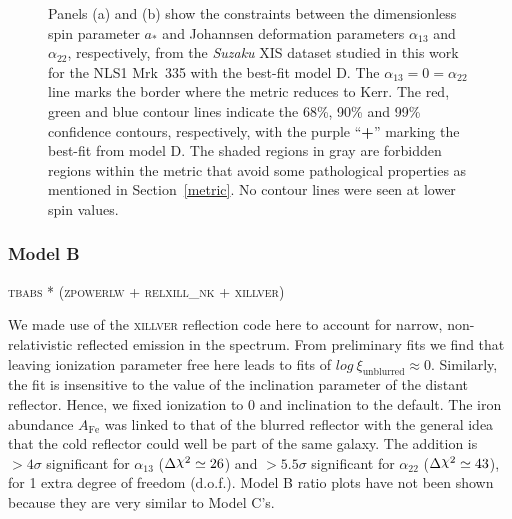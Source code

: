 \documentclass[aps,prd,twocolumn,superscriptaddress,nofootinbib,amsmath,amssymb]{revtex4-1}
\DeclareRobustCommand{\rchi}{{\mathpalette\irchi\relax}}
\newcommand{\irchi}[2]{\raisebox{\depth}{$#1\chi$}} %
\begin{document}
\begin{figure*}[!t]
\begin{center}
        \quad
        
     \caption{Panels (a) and (b) show the constraints between the dimensionless spin parameter $a_*$ and Johannsen deformation parameters $\alpha_{13}$ and $\alpha_{22}$, respectively, from the \textit{Suzaku} XIS dataset studied in this work for the NLS1 Mrk~335 with the best-fit model D. The $\alpha_{13}=0=\alpha_{22}$ line marks the border where the metric reduces to Kerr. The red, green and blue contour lines indicate the 68\%, 90\% and 99\% confidence contours, respectively, with the purple ``\textbf{+}'' marking the best-fit from model D. The shaded regions in gray are forbidden regions within the metric that avoid some pathological properties as mentioned in Section~\ref{metric}. No contour lines were seen at lower spin values.}\label{ALPHA}
\end{center}
\end{figure*}


\subsubsection{Model B}\label{ModB}
\begin{center}
\textsc{tbabs * (zpowerlw + relxill\_nk + xillver)}
\end{center}

We made use of the \textsc{xillver} reflection code here to account for narrow, non-relativistic reflected emission in the spectrum. From preliminary fits we find that leaving ionization parameter free here leads to fits of $log~\xi_{\textrm{unblurred}} \approx 0$. Similarly, the fit is insensitive to the value of the inclination parameter of the distant reflector. Hence, we fixed ionization to 0 and inclination to the default. The iron abundance $A_{\textrm{Fe}}$ was linked to that of the blurred reflector with the general idea that the cold reflector could well be part of the same galaxy. The addition is $>4\sigma$ significant for $\alpha_{13}$ ($\Delta\rchi^2 \simeq 26$) and $>5.5\sigma$ significant for $\alpha_{22}$ ($\Delta\rchi^2 \simeq 43$), for 1 extra degree of freedom (d.o.f.). Model B ratio plots have not been shown because they are very similar to Model C's.
\end{document}
